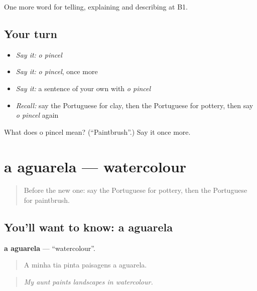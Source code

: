 \begin{grammarlens}[title={What you've built}]
One more word for telling, explaining and describing at B1.
\end{grammarlens}

\subsection*{Your turn}
\begin{itemize}
\raggedright
  \item \emph{Say it:} \emph{o pincel}
  \item \emph{Say it:} \emph{o pincel}, once more
  \item \emph{Say it:} a sentence of your own with \emph{o pincel}
  \item \emph{Recall:} say the Portuguese for clay, then the Portuguese for pottery, then say \emph{o pincel} again
\end{itemize}

\begin{tcolorbox}[breakable,colback=teal!4,colframe=teal!35!black,title={Before you move on}]
What does o pincel mean? (\textquotedblleft{}Paintbrush\textquotedblright{}.) Say it once more.
\end{tcolorbox}
\section[a aguarela]{a aguarela — watercolour}

\label{lesson:PT-C505-aguarela}



\begin{quote}
Before the new one: say the Portuguese for pottery, then the Portuguese for paintbrush.
\end{quote}

\subsection*{You'll want to know: a aguarela}
\textbf{a aguarela} — \textquotedblleft{}watercolour\textquotedblright{}.

\begin{quote}
A minha tia pinta paisagens a aguarela.
\end{quote}

\begin{quote}
\emph{My aunt paints landscapes in watercolour.}
\end{quote}

